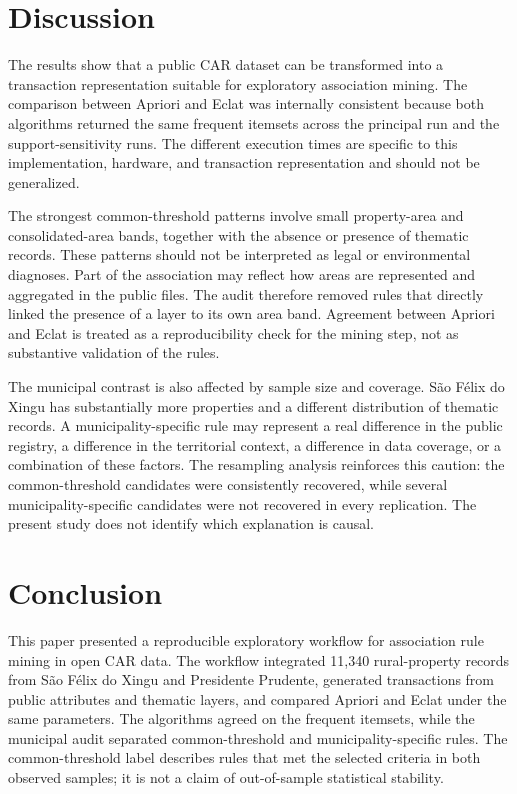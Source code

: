 \documentclass[11pt]{article}
\begin{document}
\section{Discussion}

The results show that a public CAR dataset can be transformed into a transaction representation suitable for exploratory association mining. The comparison between Apriori and Eclat was internally consistent because both algorithms returned the same frequent itemsets across the principal run and the support-sensitivity runs. The different execution times are specific to this implementation, hardware, and transaction representation and should not be generalized.

The strongest common-threshold patterns involve small property-area and consolidated-area bands, together with the absence or presence of thematic records. These patterns should not be interpreted as legal or environmental diagnoses. Part of the association may reflect how areas are represented and aggregated in the public files. The audit therefore removed rules that directly linked the presence of a layer to its own area band. Agreement between Apriori and Eclat is treated as a reproducibility check for the mining step, not as substantive validation of the rules.

The municipal contrast is also affected by sample size and coverage. São Félix do Xingu has substantially more properties and a different distribution of thematic records. A municipality-specific rule may represent a real difference in the public registry, a difference in the territorial context, a difference in data coverage, or a combination of these factors. The resampling analysis reinforces this caution: the common-threshold candidates were consistently recovered, while several municipality-specific candidates were not recovered in every replication. The present study does not identify which explanation is causal.

\section{Conclusion}

This paper presented a reproducible exploratory workflow for association rule mining in open CAR data. The workflow integrated 11,340 rural-property records from São Félix do Xingu and Presidente Prudente, generated transactions from public attributes and thematic layers, and compared Apriori and Eclat under the same parameters. The algorithms agreed on the frequent itemsets, while the municipal audit separated common-threshold and municipality-specific rules. The common-threshold label describes rules that met the selected criteria in both observed samples; it is not a claim of out-of-sample statistical stability.
\end{document}
